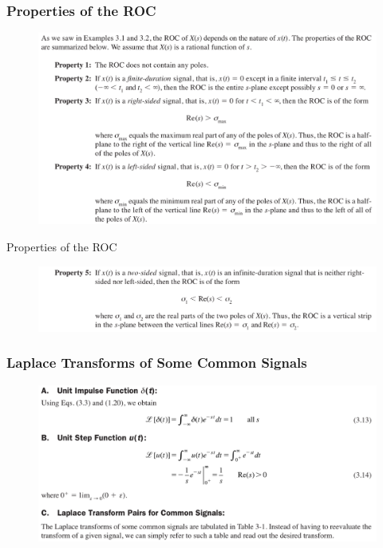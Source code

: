\documentclass[pdflatex,compress,mathserif]{beamer}
\begin{document}
\begin{frame}
	\frametitle{Properties of the ROC}
	\begin{figure}
		\centering
		\includegraphics[width=\linewidth]{img/img11}
	\end{figure}
\end{frame}

\begin{frame}{Properties of the ROC}
	\begin{figure}
		\centering
		\includegraphics[width=\linewidth]{img/img12}
	\end{figure}
\end{frame}

\begin{frame}
	\frametitle{Laplace Transforms of Some Common Signals}
	\begin{figure}
		\centering
		\includegraphics[width=\linewidth]{img/img13}
	\end{figure}
\end{frame}
\end{document}
